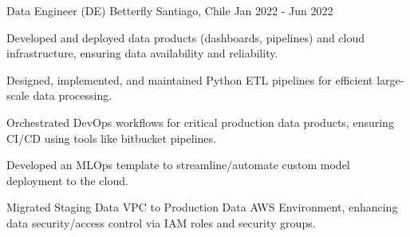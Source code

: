 \cventry
{Data Engineer (DE)}
{Betterfly}
{Santiago, Chile}
{Jan 2022 - Jun 2022}
{
\begin{cvitems}
    \item Developed and deployed data products (dashboards, pipelines) and cloud infrastructure, ensuring data availability and reliability.
    \item Designed, implemented, and maintained Python ETL pipelines for efficient large-scale data processing.
    \item Orchestrated DevOps workflows for critical production data products, ensuring CI/CD using tools like bitbucket pipelines.
    \item Developed an MLOps template to streamline/automate custom model deployment to the cloud.
    \item Migrated Staging Data VPC to Production Data AWS Environment, enhancing data security/access control via IAM roles and security groups.
\end{cvitems}
}
